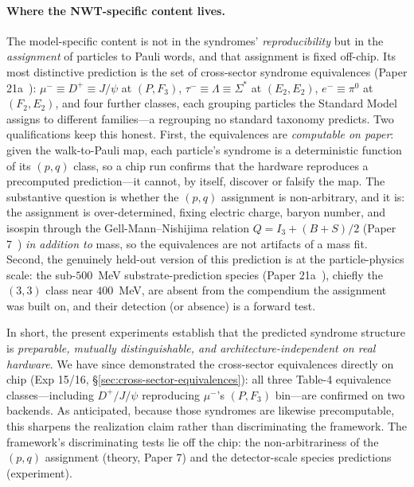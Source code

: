 \documentclass[11pt]{article}
\begin{document}
\paragraph{Where the NWT-specific content lives.}  The model-specific content is not in the syndromes' \emph{reproducibility} but in the \emph{assignment} of particles to Pauli words, and that assignment is fixed off-chip.  Its most distinctive prediction is the set of cross-sector syndrome equivalences (Paper 21a~\cite[\S 7.2]{Paper21a}): $\mu^- \equiv D^+ \equiv J/\psi$ at $(P, F_3)$, $\tau^- \equiv \Lambda \equiv \Sigma^*$ at $(E_2, E_2)$, $e^- \equiv \pi^0$ at $(F_2, E_2)$, and four further classes, each grouping particles the Standard Model assigns to different families---a regrouping no standard taxonomy predicts.  Two qualifications keep this honest.  First, the equivalences are \emph{computable on paper}: given the walk-to-Pauli map, each particle's syndrome is a deterministic function of its $(p, q)$ class, so a chip run confirms that the hardware reproduces a precomputed prediction---it cannot, by itself, discover or falsify the map.  The substantive question is whether the $(p, q)$ assignment is non-arbitrary, and it is: the assignment is over-determined, fixing electric charge, baryon number, and isospin through the Gell-Mann--Nishijima relation $Q = I_3 + (B+S)/2$ (Paper 7~\cite{Paper7}) \emph{in addition to} mass, so the equivalences are not artifacts of a mass fit.  Second, the genuinely held-out version of this prediction is at the particle-physics scale: the sub-$500$~MeV substrate-prediction species (Paper 21a~\cite[\S 8.1]{Paper21a}), chiefly the $(3,3)$ class near $400$~MeV, are absent from the compendium the assignment was built on, and their detection (or absence) is a forward test.

In short, the present experiments establish that the predicted syndrome structure is \emph{preparable, mutually distinguishable, and architecture-independent on real hardware}.  We have since demonstrated the cross-sector equivalences directly on chip (Exp 15/16, \S\ref{sec:cross-sector-equivalences}): all three Table-4 equivalence classes---including $D^+\!/J\!/\psi$ reproducing $\mu^-$'s $(P, F_3)$ bin---are confirmed on two backends.  As anticipated, because those syndromes are likewise precomputable, this sharpens the realization claim rather than discriminating the framework.  The framework's discriminating tests lie off the chip: the non-arbitrariness of the $(p, q)$ assignment (theory, Paper 7) and the detector-scale species predictions (experiment).
\end{document}
